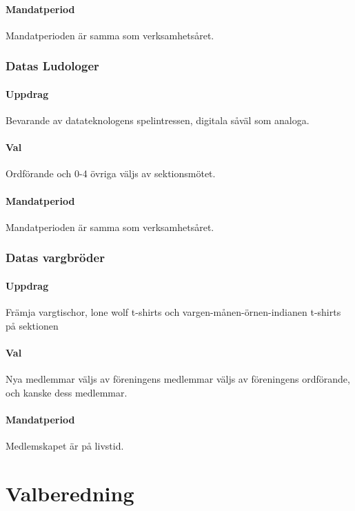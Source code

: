 \documentclass[a4paper, 10pt]{article}
\begin{document}
\paragraph{Mandatperiod\\}
Mandatperioden är samma som verksamhetsåret. 
\subsubsection{Datas Ludologer}
\paragraph{Uppdrag\\}
Bevarande av datateknologens spelintressen, digitala såväl som analoga.
\paragraph{Val\\}
Ordförande och 0-4 övriga väljs av sektionsmötet.
\paragraph{Mandatperiod\\}
Mandatperioden är samma som verksamhetsåret. 
\subsubsection{Datas vargbröder}
\paragraph{Uppdrag\\}
Främja vargtischor, lone wolf t-shirts och vargen-månen-örnen-indianen t-shirts på sektionen 
\paragraph{Val\\}
Nya medlemmar väljs av föreningens medlemmar väljs av föreningens ordförande, och kanske dess medlemmar.
\paragraph{Mandatperiod\\}
Medlemskapet är på livstid. 
\newpage
\section{Valberedning}
\end{document}
